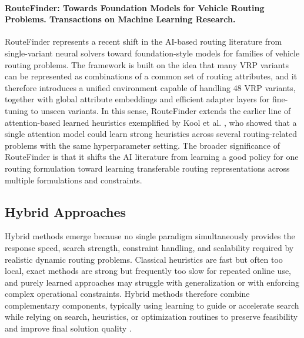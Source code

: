 \paragraph{RouteFinder: Towards Foundation Models for Vehicle Routing Problems. Transactions on Machine Learning Research.}
RouteFinder \cite{RouteFinder} represents a recent shift in the AI-based routing literature from 
single-variant neural solvers toward foundation-style models for families of vehicle routing problems. 
The framework is built on the idea that many VRP variants can be represented as combinations of a common set of 
routing attributes, and it therefore introduces a unified environment capable of handling 48 VRP variants, together 
with global attribute embeddings and efficient adapter layers for fine-tuning to unseen variants. In this sense, 
RouteFinder extends the earlier line of attention-based learned heuristics exemplified by Kool et al. 
\cite{Kool2019}, who showed that a single attention model could learn strong heuristics across 
several routing-related problems with the same hyperparameter setting. The broader significance of RouteFinder is 
that it shifts the AI literature from learning a good policy for one routing formulation toward learning transferable 
routing representations across multiple formulations and constraints.

\subsection{Hybrid Approaches}
Hybrid methods emerge because no single paradigm simultaneously provides the response speed, search strength, constraint handling, and scalability required by realistic dynamic routing problems. Classical heuristics are fast but often too local, exact methods are strong but frequently too slow for repeated online use, and purely learned approaches may struggle with generalization or with enforcing complex operational constraints. Hybrid methods therefore combine complementary components, typically using learning to guide or accelerate search while relying on search, heuristics, or optimization routines to preserve feasibility and improve final solution quality \cite{sshahbazianKnowledgeguidedHybridDeep2025,liEtAl2021,Hottung2025}.

